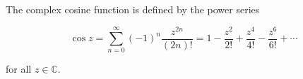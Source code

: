 The complex cosine function is defined by the power series

$$\cos z = \sum_{n=0}^{\infty} (-1)^n \frac{z^{2n}}{(2n)!} = 1 - \frac{z^2}{2!} + \frac{z^4}{4!} - \frac{z^6}{6!} + \cdots$$

for all $z \in \mathbb{C}$.
